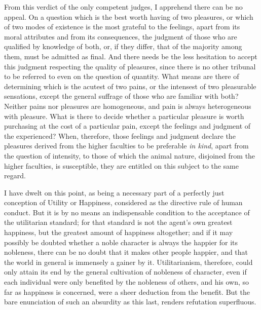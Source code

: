 \documentclass[12pt]{report}
\begin{document}
From this verdict of the only competent judges, I apprehend there can be no appeal. On a question which is the best worth having of two pleasures, or which of two modes of existence is the most grateful to the feelings, apart from its moral attributes and from its consequences, the judgment of those who are qualified by knowledge of both, or, if they differ, that of the majority among them, must be admitted as final. And there needs be the less hesitation to accept this judgment respecting the quality of pleasures, since there is no other tribunal to be referred to even on the question of quantity. What means are there of determining which is the acutest of two pains, or the intensest of two pleasurable sensations, except the general suffrage of those who are familiar with both? Neither pains nor pleasures are homogeneous, and pain is always heterogeneous with pleasure. What is there to decide whether a particular pleasure is worth purchasing at the cost of a particular pain, except the feelings and judgment of the experienced? When, therefore, those feelings and judgment declare the pleasures derived from the higher faculties to be preferable \emph{in kind}, apart from the question of intensity, to those of which the animal nature, disjoined from the higher faculties, is susceptible, they are entitled on this subject to the same regard.

I have dwelt on this point, as being a necessary part of a perfectly just conception of Utility or Happiness, considered as the directive rule of human conduct. But it is by no means an indispensable condition to the acceptance of the utilitarian standard; for that standard is not the agent's own greatest happiness, but the greatest amount of happiness altogether; and if it may possibly be doubted whether a noble character is always the happier for its nobleness, there can be no doubt that it makes other people happier, and that the world in general is immensely a gainer by it. Utilitarianism, therefore, could only attain its end by the general cultivation of nobleness of character, even if each individual were only benefited by the nobleness of others, and his own, so far as happiness is concerned, were a sheer deduction from the benefit. But the bare enunciation of such an absurdity as this last, renders refutation superfluous.
\end{document}
